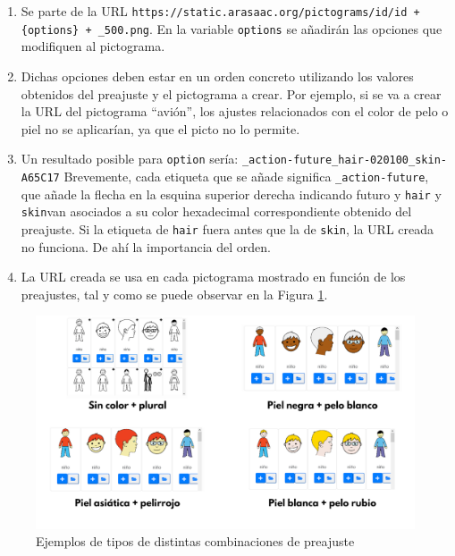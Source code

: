\begin{enumerate}
	\item Se parte de la URL \texttt{https://static.arasaac.org/pictograms/id/id + \{options\} + \_500.png}. En la variable \texttt{options} se añadirán las opciones que modifiquen al pictograma.
	
	
	\item Dichas opciones deben estar  en un orden concreto utilizando los valores obtenidos del preajuste y el pictograma a crear. Por ejemplo, si se va a crear la URL del  pictograma “avión”, los ajustes relacionados con el color de pelo o piel no se aplicarían, ya que el picto no lo permite.
	
	\item Un resultado posible para \texttt{option} sería: \texttt{\_action-future\_hair-020100\_skin-A65C17} Brevemente, cada etiqueta que se añade significa \texttt{\_action-future}, que añade la flecha en la esquina superior derecha indicando futuro y \texttt{hair} y \texttt{skin}van asociados a su color hexadecimal correspondiente obtenido del preajuste. Si la etiqueta de \texttt{hair} fuera antes que la de \texttt{skin}, la URL creada no funciona. De ahí la importancia del orden.
	
	\item La URL creada se usa en cada pictograma mostrado en función de los preajustes, tal y como se puede observar en la Figura \ref{fig:buscarpictopreajuste}.
	
\end{enumerate}



\begin{figure}[h!]
	\centering
	\includegraphics[width=0.9\linewidth]{Imagenes/Bitmap/buscarPictoPreajuste}
	\caption{Ejemplos de tipos de distintas combinaciones de preajuste}
	\label{fig:buscarpictopreajuste}
\end{figure}




